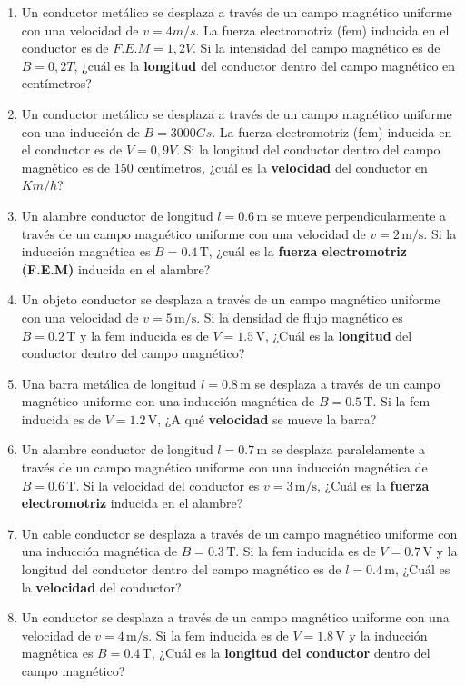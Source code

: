 \documentclass[../main]{subfiles}
\begin{document}
\begin{enumerate}
    \item Un conductor metálico se desplaza a través de un campo magnético uniforme con una velocidad de $v=4 m/s$. La fuerza electromotriz (fem) inducida en el conductor es de $F.E.M=1,2 V$. Si la intensidad del campo magnético es de $B=0,2 T$, ¿cuál es la \textbf{longitud} del conductor dentro del campo magnético en centímetros?

    \item Un conductor metálico se desplaza a través de un campo magnético uniforme con una inducción de $B=3000Gs$. La fuerza electromotriz (fem) inducida en el conductor es de $V=0,9 V$. Si la longitud del conductor dentro del campo magnético es de 150 centímetros, ¿cuál es la \textbf{velocidad} del conductor en $Km/h$?

    \item Un alambre conductor de longitud \( l = 0.6 \, \text{m} \) se mueve perpendicularmente a través de un campo magnético uniforme con una velocidad de \( v = 2 \, \text{m/s} \). Si la inducción magnética es \( B = 0.4 \, \text{T} \), ¿cuál es la \textbf{fuerza electromotriz (F.E.M)} inducida en el alambre?
    
    \item Un objeto conductor se desplaza a través de un campo magnético uniforme con una velocidad de \( v = 5 \, \text{m/s} \). Si la densidad de flujo magnético es \( B = 0.2 \, \text{T} \) y la fem inducida es de \( V = 1.5 \, \text{V} \), ¿Cuál es la \textbf{longitud} del conductor dentro del campo magnético?
    
    \item Una barra metálica de longitud \( l = 0.8 \, \text{m} \) se desplaza a través de un campo magnético uniforme con una inducción magnética de \( B = 0.5 \, \text{T} \). Si la fem inducida es de \( V = 1.2 \, \text{V} \), ¿A qué \textbf{velocidad} se mueve la barra?
    
    \item Un alambre conductor de longitud \( l = 0.7 \, \text{m} \) se desplaza paralelamente a través de un campo magnético uniforme con una inducción magnética de \( B = 0.6 \, \text{T} \). Si la velocidad del conductor es \( v = 3 \, \text{m/s} \), ¿Cuál es la \textbf{fuerza electromotriz} inducida en el alambre?


    \item Un cable conductor se desplaza a través de un campo magnético uniforme con una inducción magnética de \( B = 0.3 \, \text{T} \). Si la fem inducida es de \( V = 0.7 \, \text{V} \) y la longitud del conductor dentro del campo magnético es de \( l = 0.4 \, \text{m} \), ¿Cuál es la \textbf{velocidad} del conductor?
    
    \item Un conductor se desplaza a través de un campo magnético uniforme con una velocidad de \( v = 4 \, \text{m/s} \). Si la fem inducida es de \( V = 1.8 \, \text{V} \) y la inducción magnética es \( B = 0.4 \, \text{T} \), ¿Cuál es la \textbf{longitud del conductor} dentro del campo magnético?    
\end{enumerate}
\end{document}
